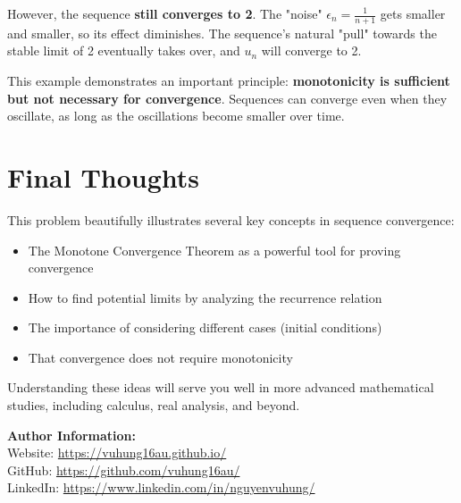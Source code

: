 \documentclass[12pt,a4paper]{article}
\theoremstyle{definition}
\begin{document}
However, the sequence \textbf{still converges to 2}. The "noise" $\epsilon_n = \frac{1}{n+1}$ gets smaller and smaller, so its effect diminishes. The sequence's natural "pull" towards the stable limit of 2 eventually takes over, and $u_n$ will converge to 2.

This example demonstrates an important principle: \textbf{monotonicity is sufficient but not necessary for convergence}. Sequences can converge even when they oscillate, as long as the oscillations become smaller over time.

\section{Final Thoughts}

This problem beautifully illustrates several key concepts in sequence convergence:
\begin{itemize}
    \item The Monotone Convergence Theorem as a powerful tool for proving convergence
    \item How to find potential limits by analyzing the recurrence relation
    \item The importance of considering different cases (initial conditions)
    \item That convergence does not require monotonicity
\end{itemize}

Understanding these ideas will serve you well in more advanced mathematical studies, including calculus, real analysis, and beyond.

\vspace{1cm}

\noindent\textbf{Author Information:}\\
\noindent Website: \url{https://vuhung16au.github.io/}\\
\noindent GitHub: \url{https://github.com/vuhung16au/}\\
\noindent LinkedIn: \url{https://www.linkedin.com/in/nguyenvuhung/}
\end{document}
